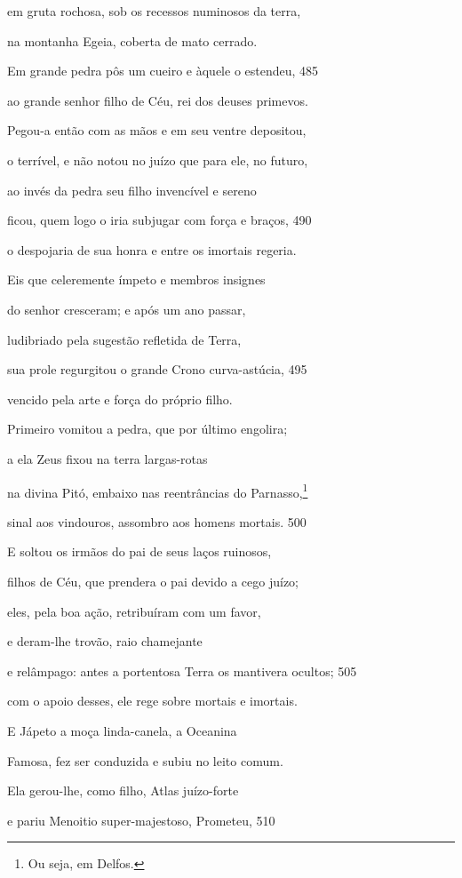 em gruta rochosa, sob os recessos numinosos da terra,

na montanha Egeia, coberta de mato cerrado.

Em grande pedra pôs um cueiro e àquele o estendeu, \num{485}

ao grande senhor filho de Céu, rei dos deuses primevos.

Pegou-a então com as mãos e em seu ventre depositou,

o terrível, e não notou no juízo que para ele, no futuro,

ao invés da pedra seu filho invencível e sereno

ficou, quem logo o iria subjugar com força e braços, \num{490}

o despojaria de sua honra e entre os imortais regeria.

\quad{}Eis que celeremente ímpeto e membros insignes

do senhor cresceram; e após um ano passar,

ludibriado pela sugestão refletida de Terra,

sua prole regurgitou o grande Crono curva-astúcia, \num{495}

vencido pela arte e força do próprio filho.

Primeiro vomitou a pedra, que por último engolira;

a ela Zeus fixou na terra largas-rotas

na divina Pitó, embaixo nas reentrâncias do Parnasso,\footnote{Ou seja, em Delfos.}

sinal aos vindouros, assombro aos homens mortais. \num{500}

\quad{}E soltou os irmãos do pai de seus laços ruinosos,

filhos de Céu, que prendera o pai devido a cego juízo;

eles, pela boa ação, retribuíram com um favor,

e deram-lhe trovão, raio chamejante

e relâmpago: antes a portentosa Terra os mantivera ocultos; \num{505}

com o apoio desses, ele rege sobre mortais e imortais.

\quad{}E Jápeto a moça linda-canela, a Oceanina

Famosa, fez ser conduzida e subiu no leito comum.

Ela gerou-lhe, como filho, Atlas juízo-forte

e pariu Menoitio super-majestoso, Prometeu, \num{510}

